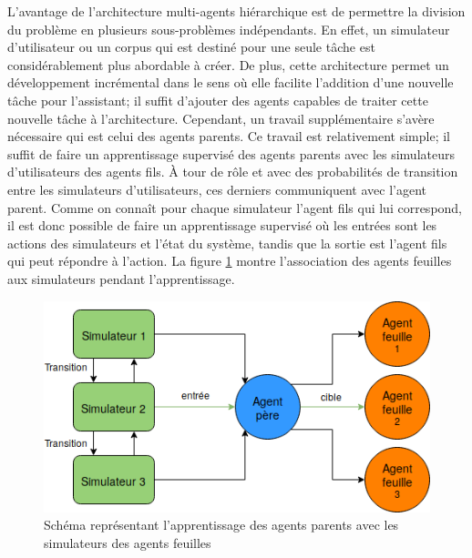 \par L'avantage de l'architecture multi-agents hiérarchique est de permettre la division du problème en plusieurs sous-problèmes indépendants. En effet, un simulateur d'utilisateur ou un corpus qui est destiné pour une seule tâche est considérablement plus abordable à créer. De plus, cette architecture permet un développement incrémental dans le sens où elle facilite l'addition d'une nouvelle tâche pour l'assistant; il suffit d'ajouter des agents capables de traiter cette nouvelle tâche à l'architecture. Cependant, un travail supplémentaire s'avère nécessaire qui est celui des agents parents. Ce travail est relativement simple; il suffit de faire un apprentissage supervisé des agents parents avec les simulateurs d'utilisateurs des agents fils. À tour de rôle et avec des probabilités de transition entre les simulateurs d'utilisateurs, ces derniers communiquent avec l'agent parent. Comme on connaît pour chaque simulateur l'agent fils qui lui correspond, il est donc possible de faire un apprentissage supervisé où les entrées sont les actions des simulateurs et l'état du système, tandis que la sortie est l'agent fils qui peut répondre à l'action. La figure \ref{train_parent} montre l'association des agents feuilles aux simulateurs pendant l'apprentissage.
\begin{figure}[H] 
	
	\centering
	\includegraphics[width=0.5\linewidth]{images/Conception/DM/train_parent.png}
	\caption{Schéma représentant l'apprentissage des agents parents avec les simulateurs des agents feuilles}\label{train_parent}
\end{figure}
